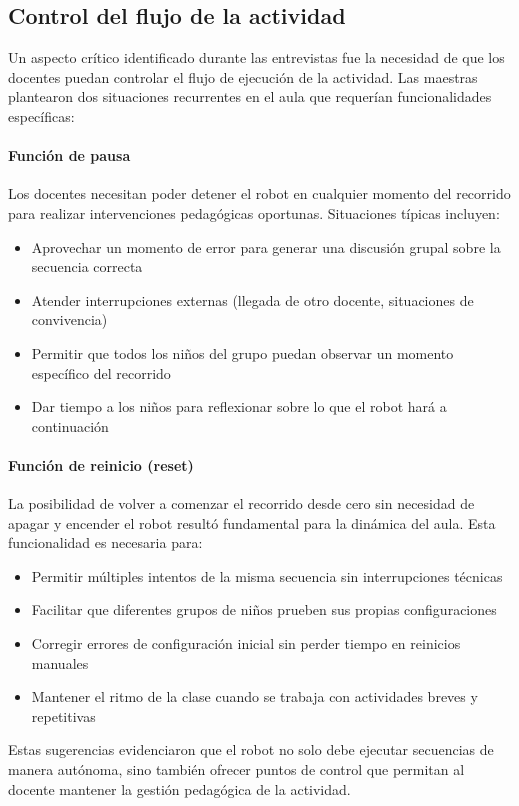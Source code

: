 \documentclass{prgrado}
\begin{document}
\subsection{Control del flujo de la actividad}
Un aspecto crítico identificado durante las entrevistas fue la necesidad de que los docentes puedan controlar el flujo de ejecución de la actividad. Las maestras plantearon dos situaciones recurrentes en el aula que requerían funcionalidades específicas:
\paragraph{Función de pausa} Los docentes necesitan poder detener el robot en cualquier momento del recorrido para realizar intervenciones pedagógicas oportunas. Situaciones típicas incluyen:
\begin{itemize}
\item Aprovechar un momento de error para generar una discusión grupal sobre la secuencia correcta
\item Atender interrupciones externas (llegada de otro docente, situaciones de convivencia)
\item Permitir que todos los niños del grupo puedan observar un momento específico del recorrido
\item Dar tiempo a los niños para reflexionar sobre lo que el robot hará a continuación
\end{itemize}
\paragraph{Función de reinicio (reset)} La posibilidad de volver a comenzar el recorrido desde cero sin necesidad de apagar y encender el robot resultó fundamental para la dinámica del aula. Esta funcionalidad es necesaria para:
\begin{itemize}
\item Permitir múltiples intentos de la misma secuencia sin interrupciones técnicas
\item Facilitar que diferentes grupos de niños prueben sus propias configuraciones
\item Corregir errores de configuración inicial sin perder tiempo en reinicios manuales
\item Mantener el ritmo de la clase cuando se trabaja con actividades breves y repetitivas
\end{itemize}
Estas sugerencias evidenciaron que el robot no solo debe ejecutar secuencias de manera autónoma, sino también ofrecer puntos de control que permitan al docente mantener la gestión pedagógica de la actividad.
\end{document}
